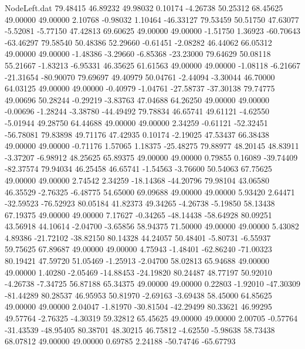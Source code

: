 \begin{filecontents}{NodeLeft.dat}
  79.48415   46.89232   49.98032     0.10174   -4.26738   50.25312   68.45625   49.00000   49.00000    2.10768   -0.98032    1.10464  -46.33127
  79.53459   50.51750   47.63077    -5.52081   -5.77150   47.42813   69.60625   49.00000   49.00000   -1.51750    1.36923  -60.70643  -63.46297
  79.58540   50.48386   52.29660    -0.61451   -2.08282   46.44062   66.05312   49.00000   49.00000   -1.48386   -3.29660   -6.85368  -23.23000
  79.64629   50.08118   55.21667    -1.83213   -6.95331   46.35625   61.61563   49.00000   49.00000   -1.08118   -6.21667  -21.31654  -80.90070
  79.69697   49.40979   50.04761    -2.44094   -3.30044   46.70000   64.03125   49.00000   49.00000   -0.40979   -1.04761  -27.58737  -37.30138
  79.74775   49.00696   50.28244    -0.29219   -3.83763   47.04688   64.26250   49.00000   49.00000   -0.00696   -1.28244   -3.38780  -44.49492
  79.78834   46.65741   49.61121    -4.62550   -5.01944   49.28750   64.44688   49.00000   49.00000    2.34259   -0.61121  -52.32451  -56.78081
  79.83898   49.71176   47.42935     0.10174   -2.19025   47.53437   66.38438   49.00000   49.00000   -0.71176    1.57065    1.18375  -25.48275
  79.88977   48.20145   48.83911    -3.37207   -6.98912   48.25625   65.89375   49.00000   49.00000    0.79855    0.16089  -39.74409  -82.37574
  79.94034   46.25458   46.65741    -1.54563   -3.76600   50.54063   67.75625   49.00000   49.00000    2.74542    2.34259  -18.14368  -44.20796
  79.98104   43.06580   46.35529    -2.76325   -6.48775   54.65000   69.09688   49.00000   49.00000    5.93420    2.64471  -32.59523  -76.52923
  80.05184   41.82373   49.34265    -4.26738   -5.19850   58.13438   67.19375   49.00000   49.00000    7.17627   -0.34265  -48.14438  -58.64928
  80.09251   43.56918   44.10614    -2.04700   -3.65856   58.94375   71.50000   49.00000   49.00000    5.43082    4.89386  -21.72102  -38.82150
  80.14328   44.24057   50.48401    -5.80731   -6.55937   59.75625   67.89687   49.00000   49.00000    4.75943   -1.48401  -62.86240  -71.00323
  80.19421   47.59720   51.05469    -1.25913   -2.04700   58.02813   65.94688   49.00000   49.00000    1.40280   -2.05469  -14.88453  -24.19820
  80.24487   48.77197   50.92010    -4.26738   -7.34725   56.87188   65.34375   49.00000   49.00000    0.22803   -1.92010  -47.30309  -81.44289
  80.28537   46.95953   50.81970    -2.69163   -3.69438   58.45000   64.85625   49.00000   49.00000    2.04047   -1.81970  -30.81504  -42.29499
  80.33621   46.99295   49.57764    -2.76325   -4.30319   59.32812   65.45625   49.00000   49.00000    2.00705   -0.57764  -31.43539  -48.95405
  80.38701   48.30215   46.75812    -4.62550   -5.98638   58.73438   68.07812   49.00000   49.00000    0.69785    2.24188  -50.74746  -65.67793

\end{filecontents}
